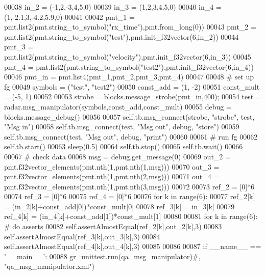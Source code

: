 \begin{DoxyCode}
00038         in\_2 = (-1,2,-3,4,5,0)
00039         in\_3 = (1,2,3,4,5,0)
00040         in\_4 = (1,-2.1,3,-4.2,5.9,0)
00041         
00042         pmt\_1 = pmt.list2(pmt.string\_to\_symbol(\textcolor{stringliteral}{"rx\_time"}),pmt.from\_long(0))
00043         pmt\_2 = pmt.list2(pmt.string\_to\_symbol(\textcolor{stringliteral}{"test"}),pmt.init\_f32vector(6,in\_2))
00044         pmt\_3 = pmt.list2(pmt.string\_to\_symbol(\textcolor{stringliteral}{"velocity"}),pmt.init\_f32vector(6,in\_3))
00045         pmt\_4 = pmt.list2(pmt.string\_to\_symbol(\textcolor{stringliteral}{"test2"}),pmt.init\_f32vector(6,in\_4))
00046         pmt\_in = pmt.list4(pmt\_1,pmt\_2,pmt\_3,pmt\_4)
00047         
00048         \textcolor{comment}{# set up fg}
00049         symbols = (\textcolor{stringliteral}{"test"}, \textcolor{stringliteral}{"test2"})
00050         const\_add = (1, -2)
00051         const\_mult = (-5, 1)
00052         
00053         strobe = blocks.message\_strobe(pmt\_in,400);
00054         test = radar.msg\_manipulator(symbols,const\_add,const\_mult)
00055         debug = blocks.message\_debug()
00056         
00057         self.tb.msg\_connect(strobe, \textcolor{stringliteral}{"strobe"}, test, \textcolor{stringliteral}{"Msg in"})
00058         self.tb.msg\_connect(test, \textcolor{stringliteral}{"Msg out"}, debug, \textcolor{stringliteral}{"store"})
00059         self.tb.msg\_connect(test, \textcolor{stringliteral}{"Msg out"}, debug, \textcolor{stringliteral}{"print"})
00060         
00061         \textcolor{comment}{# run fg}
00062         self.tb.start()
00063         sleep(0.5)
00064         self.tb.stop()
00065         self.tb.wait()
00066         
00067         \textcolor{comment}{# check data}
00068         msg = debug.get\_message(0)
00069         out\_2 = pmt.f32vector\_elements(pmt.nth(1,pmt.nth(1,msg)))
00070         out\_3 = pmt.f32vector\_elements(pmt.nth(1,pmt.nth(2,msg)))
00071         out\_4 = pmt.f32vector\_elements(pmt.nth(1,pmt.nth(3,msg)))
00072         
00073         ref\_2 = [0]*6
00074         ref\_3 = [0]*6
00075         ref\_4 = [0]*6
00076         \textcolor{keywordflow}{for} k \textcolor{keywordflow}{in} range(6):
00077             ref\_2[k] = (in\_2[k]+const\_add[0])*const\_mult[0]
00078             ref\_3[k] = in\_3[k]
00079             ref\_4[k] = (in\_4[k]+const\_add[1])*const\_mult[1]
00080             
00081         \textcolor{keywordflow}{for} k \textcolor{keywordflow}{in} range(6): \textcolor{comment}{# do asserts}
00082             self.assertAlmostEqual(ref\_2[k],out\_2[k],3)
00083             self.assertAlmostEqual(ref\_3[k],out\_3[k],3)
00084             self.assertAlmostEqual(ref\_4[k],out\_4[k],3)
00085 
00086 
00087 \textcolor{keywordflow}{if} \_\_name\_\_ == \textcolor{stringliteral}{'\_\_main\_\_'}:
00088     gr\_unittest.run(qa\_msg\_manipulator)\textcolor{comment}{#, "qa\_msg\_manipulator.xml")}
\end{DoxyCode}
